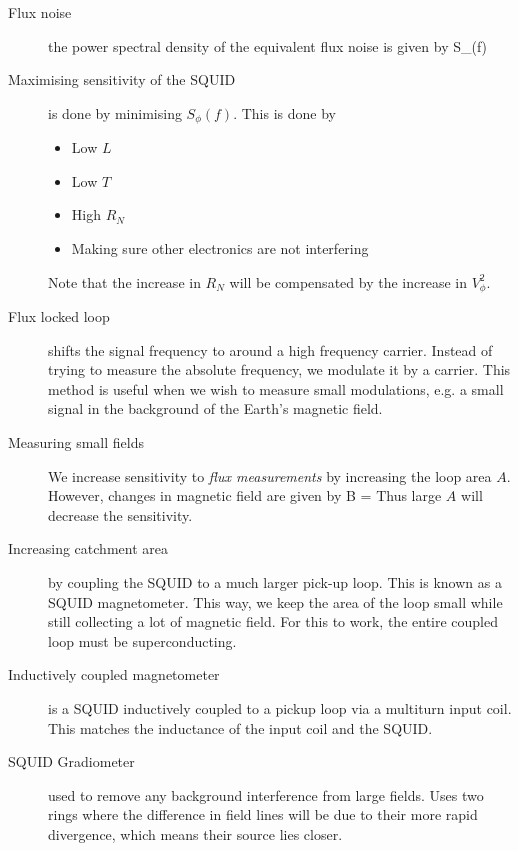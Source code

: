 \begin{description}
\item[Flux noise] the power spectral density of the equivalent flux noise is given by 
\beq
S_\phi(f)  \simeq {}
\eeq

\item[Maximising sensitivity of the SQUID] is done by minimising $S_\phi(f)$. This is done by 
\begin{itemize}
\item Low $L$
\item Low $T$
\item High $R_N$
\item Making sure other electronics are not interfering
\end{itemize}
Note that the increase in $R_N$ will be compensated by the increase in $V^2_\phi$. 


\item[Flux locked loop] shifts the signal frequency to around a high frequency carrier. Instead of trying to measure the absolute frequency,  we modulate it by a carrier. This method is useful when we wish to measure small modulations, e.g. a small signal in the background of the Earth's magnetic field. 

\item[Measuring small fields] We increase sensitivity to \emph{flux measurements} by increasing the loop area $A$. However, changes in magnetic field are given by 
\beq
\delta B = 
\eeq
Thus large $A$ will decrease the sensitivity. 

\item[Increasing catchment area] by coupling the SQUID to a much larger pick-up loop. This is known as a SQUID magnetometer. This way, we keep the area of the loop small while still collecting a lot of magnetic field. For this to work, the entire coupled loop must be superconducting. 

\item[Inductively coupled magnetometer] is a SQUID inductively coupled to a pickup loop via a multiturn input coil. This matches the inductance of the input coil and the SQUID. 


\item[SQUID Gradiometer] used to remove any background interference from large fields. Uses two rings where the difference in field lines will be due to their more rapid divergence, which means their source lies closer. 


\end{description}
